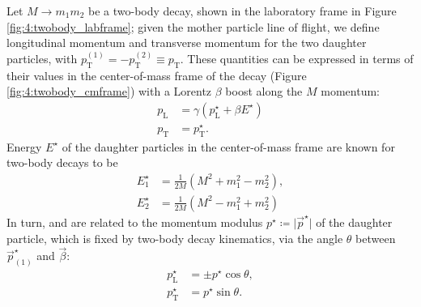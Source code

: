 
Let $M \rightarrow m_1 m_2$ be a two-body decay, shown in the laboratory frame in Figure \ref{fig:4:twobody_labframe};
given the mother particle line of flight, we define longitudinal momentum \pl and transverse momentum \pt for the two daughter particles, with $p_\text{T}^{(1)} = - p_\text{T}^{(2)} \equiv p_\text{T}$.
These quantities can be expressed in terms of their values in the center-of-mass frame of the decay (Figure \ref{fig:4:twobody_cmframe}) with a Lorentz $\beta$ boost along the $M$ momentum:
\begin{subequations}
\label{eq:4:ap_p_lorentz}
\begin{align}
	p_\text{L} &= \gamma \left( p_\text{L}^\star + \beta E^\star \right)
	\label{eq:4:ap_pL_lorentz} \\
	p_\text{T} &= p_\text{T}^\star.
	\label{eq:4:ap_pT_lorentz}
\end{align}
\end{subequations}
Energy $E^\star$ of the daughter particles in the center-of-mass frame are known for two-body decays to be
\begin{subequations}
\label{eq:4:ap_Estar}
\begin{align}
	E_1^\star &=
	\frac{1}{2M}
	\left(M^2 + m_1^2 - m_2^2 \right), \\
	E_2^\star &=
	\frac{1}{2M}
	\left(M^2 - m_1^2 + m_2^2 \right)
\end{align}
\end{subequations}
In turn, \plstar and \ptstar are related to the momentum modulus $p^\star \coloneqq \lvert \vec{p}^\star \rvert$ of the daughter particle, which is fixed by two-body decay kinematics, via the angle $\theta$ between $\vec{p}^\star_{(1)}$ and $\vec{\beta}$:
\begin{subequations}
\label{eq:4:ap_p_theta}
\begin{align}
	p_\text{L}^\star &= \pm p^\star \cos\theta,	\label{eq:4:ap_pL_theta} \\
	p_\text{T}^\star &= p^\star \sin\theta.		\label{eq:4:ap_pT_theta}
\end{align}
\end{subequations}

